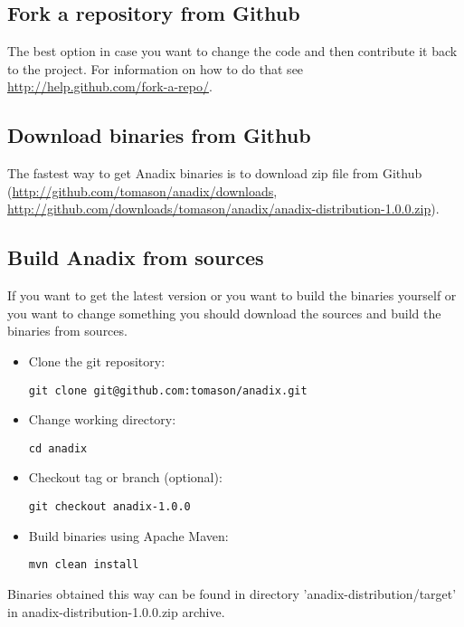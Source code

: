 \documentclass{report}
\begin{document}
\subsection{Fork a repository from Github}
The best option in case you want to change the code and then contribute it back to the project. For information on how to do that see \url{http://help.github.com/fork-a-repo/}.

\subsection{Download binaries from Github}
The fastest way to get Anadix binaries is to download zip file from Github
(\url{http://github.com/tomason/anadix/downloads}, 
\url{http://github.com/downloads/tomason/anadix/anadix-distribution-1.0.0.zip}).

\subsection{Build Anadix from sources}
If you want to get the latest version or you want to build the binaries
yourself or you want to change something you should download the sources and
build the binaries from sources.
\begin{itemize}
  \item Clone the git repository:
    \begin{verbatim}
git clone git@github.com:tomason/anadix.git
	\end{verbatim}
  \item Change working directory:
	\begin{verbatim}
cd anadix
	\end{verbatim}
  \item Checkout tag or branch (optional):
    \begin{verbatim}
git checkout anadix-1.0.0
    \end{verbatim}
  \item Build binaries using Apache Maven:
    \begin{verbatim}
mvn clean install
	\end{verbatim}
\end{itemize}
Binaries obtained this way can be found in directory
'anadix-distribution/target' in anadix-distribution-1.0.0.zip archive.
\end{document}
